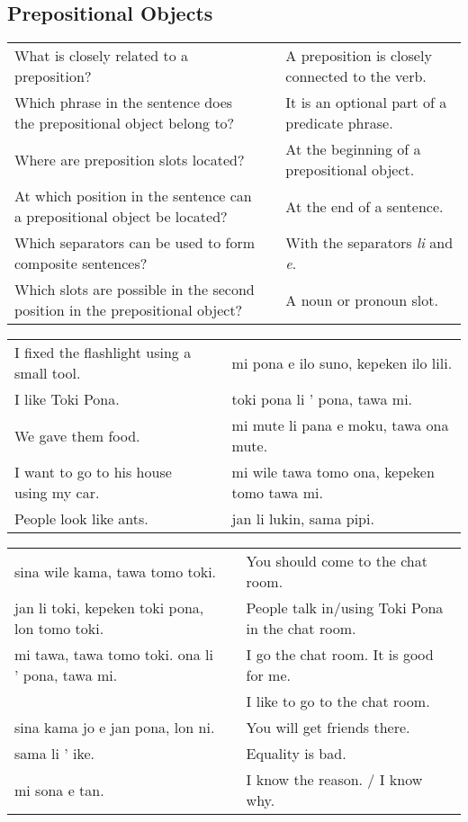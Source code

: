 \newpage
%
\subsection*{Prepositional Objects} 
\label{'prepositional_objects'}
%
\begin{supertabular}{p{5,5cm}|ll}
What is closely related to a preposition?  && A preposition is closely connected to the verb. \\ %
Which phrase in the sentence does the prepositional object belong to?  &&  It is an optional part of a predicate phrase.  \\ %
Where are preposition slots located?  &&  At the beginning of a prepositional object. \\ %
At which position in the sentence can a prepositional object be located? && At the end of a sentence. \\ %
Which separators can be used to form composite sentences?  &&  With the separators \textit{li} and \textit{e}. \\ %
Which slots are possible in the second position in the prepositional object?  &&  A noun or pronoun slot. \\ %
\end{supertabular}

\begin{supertabular}{p{5,5cm}|ll}
I fixed the flashlight using a small tool.  && mi pona e ilo suno, kepeken ilo lili. \\ %
I like Toki Pona.  && toki pona li ' pona, tawa mi. \\ %
We gave them food.  && mi mute li pana e moku, tawa ona mute. \\ %
I want to go to his house using my car.  && mi wile tawa tomo ona, kepeken tomo tawa mi. \\ %
People look like ants.  && jan li lukin, sama pipi. \\ %
\end{supertabular}  

\begin{supertabular}{p{5,5cm}|ll}
sina wile kama, tawa tomo toki.  && You should come to the chat room. \\
jan li toki, kepeken toki pona, lon tomo toki.  && People talk in/using Toki Pona in the chat room. \\
mi tawa, tawa tomo toki. ona li ' pona, tawa mi.  && I go the chat room. It is good for me. \\
                                         && I like to go to the chat room. \\ %
sina kama jo e jan pona, lon ni.  && You will get friends there. \\
sama li ' ike. && Equality is bad. \\
mi sona e tan. && I know the reason. / I know why. \\
\end{supertabular} 

